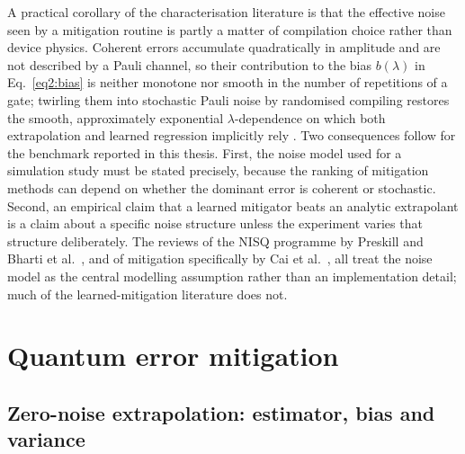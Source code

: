 \documentclass[Thesis.tex]{subfiles}
\begin{document}
A practical corollary of the characterisation literature is that the effective
noise seen by a mitigation routine is partly a matter of compilation choice
rather than device physics. Coherent errors accumulate quadratically in
amplitude and are not described by a Pauli channel, so their contribution to
the bias $b(\lambda)$ in Eq.~\eqref{eq2:bias} is neither monotone nor smooth
in the number of repetitions of a gate; twirling them into stochastic Pauli
noise by randomised compiling restores the smooth, approximately exponential
$\lambda$-dependence on which both extrapolation and learned regression
implicitly rely \cite{wallman2016noise}. Two consequences follow for the
benchmark reported in this thesis. First, the noise model used for a simulation
study must be stated precisely, because the ranking of mitigation methods can
depend on whether the dominant error is coherent or stochastic. Second, an
empirical claim that a learned mitigator beats an analytic extrapolant is a
claim about a specific noise structure unless the experiment varies that
structure deliberately. The reviews of the NISQ programme by Preskill
\cite{preskill2018nisq} and Bharti et al.\ \cite{bharti2022noisy}, and of
mitigation specifically by Cai et al.\ \cite{cai2023review}, all treat the
noise model as the central modelling assumption rather than an implementation
detail; much of the learned-mitigation literature does not.

\section{Quantum error mitigation}\label{sec2:qem}

\subsection{Zero-noise extrapolation: estimator, bias and variance}
\end{document}
